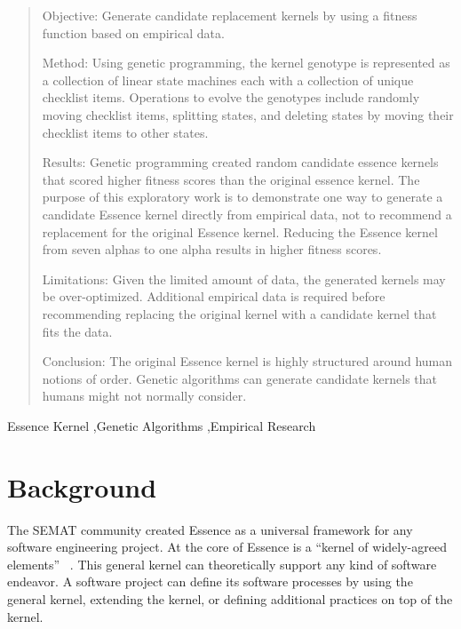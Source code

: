 \documentclass[3p,times,procedia]{elsarticle}
\begin{document}
\begin{frontmatter}
\begin{abstract}
Objective: Generate candidate replacement kernels by using a fitness function based on empirical data.

Method: Using genetic programming, the kernel genotype is represented as a collection of linear state machines each with a collection of unique checklist items. Operations to evolve the genotypes include randomly moving checklist items, splitting states, and deleting states by moving their checklist items to other states. 

Results: Genetic programming created random candidate essence kernels that scored higher fitness scores than the original essence kernel. The purpose of this exploratory work is to demonstrate one way to generate a candidate Essence kernel directly from empirical data, not to recommend a replacement for the original Essence kernel. Reducing the Essence kernel from seven alphas to one alpha results in higher fitness scores.

Limitations: Given the limited amount of data, the generated kernels may be over-optimized. Additional empirical data is required before recommending replacing the original kernel with a candidate kernel that fits the data.

Conclusion: The original Essence kernel is highly structured around human notions of order. Genetic algorithms can generate candidate kernels that humans might not normally consider.

\end{abstract}

\begin{keyword}
Essence Kernel \sep Genetic Algorithms \sep Empirical Research
\end{keyword}

\end{frontmatter}


\section{Background}
The SEMAT community created Essence as a universal framework for any software engineering project. At the core of Essence is a ``kernel of widely-agreed elements'' ~\cite{JacobsonQueue}. This general kernel can theoretically support any kind of software endeavor. A software project can define its software processes by using the general kernel, extending the kernel, or defining additional practices on top of the kernel.
\end{document}
